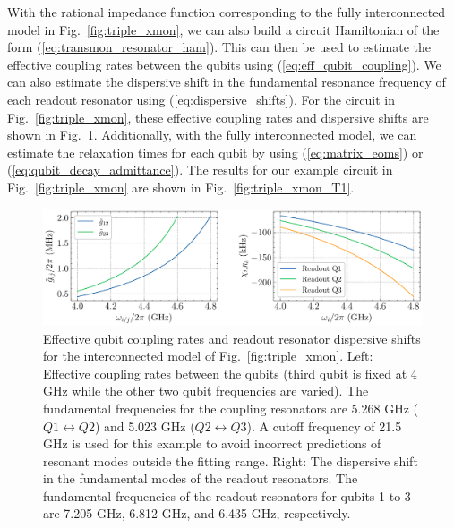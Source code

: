 \newpage

With the rational impedance function corresponding to the fully interconnected model in Fig.\ \ref{fig:triple_xmon}, we can also build a circuit Hamiltonian of the form (\ref{eq:transmon_resonator_ham}). This can then be used to estimate the effective coupling rates between the qubits using (\ref{eq:eff_qubit_coupling}). We can also estimate the dispersive shift in the fundamental resonance frequency of each readout resonator using (\ref{eq:dispersive_shifts}). For the circuit in Fig.\ \ref{fig:triple_xmon}, these effective coupling rates and dispersive shifts are shown in Fig.\ \ref{fig:triple_xmon_geff_chi}. Additionally, with the fully interconnected model, we can estimate the relaxation times for each qubit by using (\ref{eq:matrix_eoms}) or (\ref{eq:qubit_decay_admittance}). The results for our example circuit in Fig.\ \ref{fig:triple_xmon} are shown in Fig.\ \ref{fig:triple_xmon_T1}.

\begin{figure}[h!]
    \centering
    \includegraphics[width=\textwidth]{figures/three_qubit_geff_chi.pdf}
    \caption{Effective qubit coupling rates and readout resonator dispersive shifts for the interconnected model of Fig.\ \ref{fig:triple_xmon}. Left: Effective coupling rates between the qubits (third qubit is fixed at 4 GHz while the other two qubit frequencies are varied). The fundamental frequencies for the coupling resonators are 5.268 GHz ($Q1 \leftrightarrow Q2$) and 5.023 GHz ($Q2 \leftrightarrow Q3$). A cutoff frequency of 21.5 GHz is used for this example to avoid incorrect predictions of resonant modes outside the fitting range. Right: The dispersive shift in the fundamental modes of the readout resonators. The fundamental frequencies of the readout resonators for qubits 1 to 3 are 7.205 GHz, 6.812 GHz, and 6.435 GHz, respectively.}
    \label{fig:triple_xmon_geff_chi}
\end{figure}

